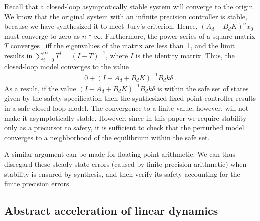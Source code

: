 Recall that a closed-loop asymptotically stable system will converge to the origin.  
We know that the original system with an infinite precision controller is stable, 
because we have synthesized it to meet Jury's criterion.  
Hence, $(A_d - B_dK)^n x_0$  must converge to zero as $n \uparrow \infty$. 
Furthermore, the power series of a square matrix $T$ converges~\cite{horn1990matrix} iff the eigenvalues of the matrix are less
than~1, and the limit results in 
%
$\sum_{i=0}^{\infty}T^i  = (I - T)^{-1}$, 
%
where $I$ is the identity matrix. 
Thus, the closed-loop model converges to the value 
%
\begin{align*}
0 + (I - A_d + B_dK)^{-1}B_dk\delta \,. 
\end{align*}
%
As a result, if the value $(I - A_d + B_dK)^{-1}B_dk\delta$ is within the safe set of states given by the safety specification
then the synthesized fixed-point controller results in a safe
closed-loop model.  The convergence to a finite value, however, will not
make it asymptotically stable.
However,
since in this paper we require stability only as a precursor to safety, it
is sufficient to check that the perturbed model converges to a
neighborhood of the equilibrium within the safe set. 

A similar argument can be made for floating-point arithmetic.
We can thus disregard these steady-state errors (caused by
finite precision arithmetic) when stability is ensured by synthesis, and then verify its
safety accounting for the finite precision errors.



\ifx\axelerator
\subsection{Abstract acceleration of linear dynamics } 
\label{ssec:aa}
 
